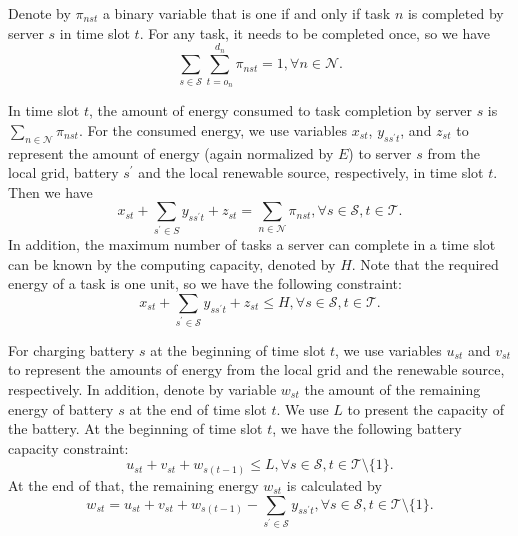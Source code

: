 \documentclass[conference, 10pt, ﬁnal, letterpaper, twocolumn]{IEEEtran}
\begin{document}
Denote by $\pi_{nst}$ a binary variable that is one if and only if task $n$ is completed by server $s$ in time slot $t$. For any task, it needs to be completed once, so we have
\begin{equation}\label{c0}
    \sum_{s \in \mathcal{S}} \sum^{d_n}_{t = o_n} \pi_{nst} = 1, \forall n \in \mathcal{N}.
\end{equation}

In time slot $t$, the amount of energy consumed to task completion by server $s$ is $\sum_{n \in \mathcal{N}} \pi_{nst}$. For the consumed energy, we use variables $x_{st}$, $y_{ss^\prime t}$, and $z_{st}$ to represent the amount of energy (again normalized by $E$) to server $s$ from the local grid, battery $s^\prime$ and the local renewable source, respectively, in time slot $t$. Then we have
\begin{equation}\label{c1}
     x_{st} + \sum_{s^\prime \in S}  y _{ss^\prime t} + z_{st} = \sum_{n \in \mathcal{N}} \pi_{nst}, \forall s \in \mathcal{S}, t \in \mathcal{T}.
\end{equation}
In addition, the maximum number of tasks a server can complete in a time slot can be known by the computing capacity, denoted by $H$. Note that the required energy of a task is one unit, so we have the following constraint:
\begin{equation}\label{c4}
    x_{st}+\sum_{s^\prime \in\mathcal{S}} y_{ss^\prime t} +z_{st} \leq H, \forall s \in \mathcal{S}, t \in \mathcal{T}.
\end{equation}

For charging battery $s$ at the beginning of time slot $t$, we use variables $u_{st}$ and $v_{st}$ to represent the amounts of energy from the local grid and the renewable source, respectively. In addition, denote by variable $w_{st}$ the amount of the remaining energy of battery $s$ at the end of time slot $t$. We use $L$ to present the capacity of the battery. At the beginning of time slot $t$, we have the following battery capacity constraint:
\begin{equation}\label{c2}
    u_{st} + v_{st} + w_{s(t-1)} \leq L, \forall s \in \mathcal{S}, t \in \mathcal{T} \setminus \{1\}.
\end{equation}
At the end of that, the remaining energy $w_{st}$ is calculated by
\begin{equation}\label{c3}
    w_{st} = u_{st} + v_{st} + w_{s(t-1)} -\sum_{s^\prime \in \mathcal{S}} y_{ss^\prime t}, \forall s \in \mathcal{S}, t \in \mathcal{T} \setminus \{1\}.
\end{equation}
\end{document}
